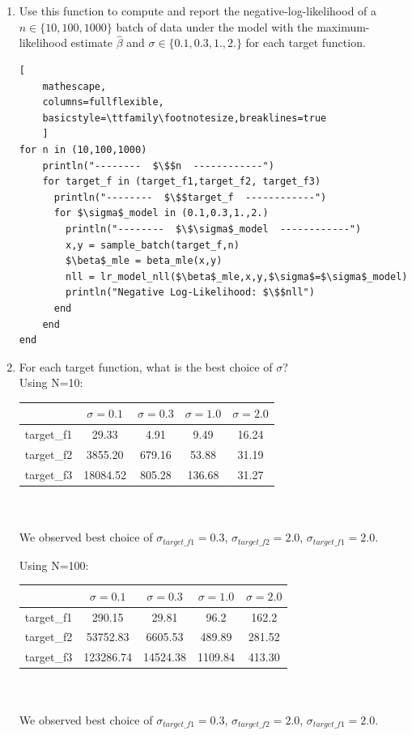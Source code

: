 \documentclass[12pt,letter]{article}
\begin{document}
\begin{enumerate}
\pagebreak

\item Use this function to compute and report the negative-log-likelihood of a $n\in \{10,100,1000\}$ batch of data under the model with the maximum-likelihood estimate $\hat\beta$ and $\sigma \in \{0.1,0.3,1.,2.\}$ for each target function.
  
\begin{lstlisting}[
    mathescape,
    columns=fullflexible,
    basicstyle=\ttfamily\footnotesize,breaklines=true
    ]
for n in (10,100,1000)
    println("--------  $\$$n  ------------")
    for target_f in (target_f1,target_f2, target_f3)
      println("--------  $\$$target_f  ------------")
      for $\sigma$_model in (0.1,0.3,1.,2.)
        println("--------  $\$\sigma$_model  ------------")
        x,y = sample_batch(target_f,n)
        $\beta$_mle = beta_mle(x,y)
        nll = lr_model_nll($\beta$_mle,x,y,$\sigma$=$\sigma$_model)
        println("Negative Log-Likelihood: $\$$nll")
      end
    end
end
\end{lstlisting}

\item For each target function, what is the best choice of $\sigma$?\\
  Using N=10:\\
  \begin{tabular}{|c|c|c|c|c|}
    \hline
    & $\sigma=0.1$ & $\sigma=0.3$ & $\sigma=1.0$ & $\sigma=2.0$ \\\hline
    target\_f1 & 29.33 & 4.91 & 9.49 & 16.24 \\\hline
    target\_f2 & 3855.20 & 679.16 & 53.88 & 31.19 \\\hline
    target\_f3 & 18084.52 & 805.28 & 136.68 & 31.27 \\\hline
  \end{tabular}\\
  \\
  We observed best choice of $\sigma_{target\_f1} = 0.3$, $\sigma_{target\_f2} = 2.0$, $\sigma_{target\_f1} = 2.0$.
  
  Using N=100:\\
  \begin{tabular}{|c|c|c|c|c|}
    \hline
    & $\sigma=0.1$ & $\sigma=0.3$ & $\sigma=1.0$ & $\sigma=2.0$ \\\hline
    target\_f1 & 290.15 & 29.81 & 96.2 & 162.2 \\\hline
    target\_f2 & 53752.83 & 6605.53 & 489.89 & 281.52 \\\hline
    target\_f3 & 123286.74 & 14524.38 & 1109.84 & 413.30 \\\hline
  \end{tabular}\\
  \\
  We observed best choice of $\sigma_{target\_f1} = 0.3$, $\sigma_{target\_f2} = 2.0$, $\sigma_{target\_f1} = 2.0$.
  

\end{enumerate}
\end{document}
